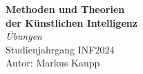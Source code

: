 \documentclass[a4paper,12pt]{article}
\begin{document}
\thispagestyle{cover}

\vspace*{5cm}

\begin{center}
  {\Huge\bfseries Methoden und Theorien \\[0.2cm] der Künstlichen Intelligenz}\\[0.4cm]
  {\Large\itshape Übungen}\\[1.2cm]
  {\Large Studienjahrgang INF2024}\\[0.4cm]
  {\Large Autor: Markus Kaupp}
\end{center}

\newpage











\end{document}
